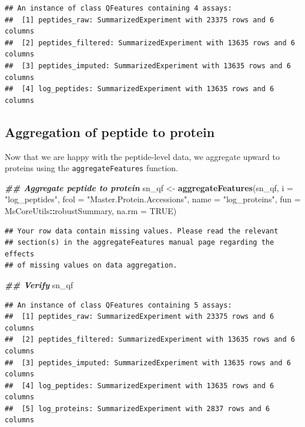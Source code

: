 \documentclass[9pt,a4paper,]{extarticle}
\newenvironment{Shaded}{\begin{snugshade}}{\end{snugshade}}
\newcommand{\AttributeTok}[1]{\textcolor[rgb]{0.13,0.29,0.53}{#1}}
\newcommand{\ConstantTok}[1]{\textcolor[rgb]{0.56,0.35,0.01}{#1}}
\newcommand{\DocumentationTok}[1]{\textcolor[rgb]{0.56,0.35,0.01}{\textbf{\textit{#1}}}}
\newcommand{\FunctionTok}[1]{\textcolor[rgb]{0.13,0.29,0.53}{\textbf{#1}}}
\newcommand{\NormalTok}[1]{#1}
\newcommand{\OtherTok}[1]{\textcolor[rgb]{0.56,0.35,0.01}{#1}}
\newcommand{\SpecialCharTok}[1]{\textcolor[rgb]{0.81,0.36,0.00}{\textbf{#1}}}
\newcommand{\StringTok}[1]{\textcolor[rgb]{0.31,0.60,0.02}{#1}}
\begin{document}
\begin{verbatim}
## An instance of class QFeatures containing 4 assays:
##  [1] peptides_raw: SummarizedExperiment with 23375 rows and 6 columns 
##  [2] peptides_filtered: SummarizedExperiment with 13635 rows and 6 columns 
##  [3] peptides_imputed: SummarizedExperiment with 13635 rows and 6 columns 
##  [4] log_peptides: SummarizedExperiment with 13635 rows and 6 columns
\end{verbatim}

\hypertarget{aggregation-of-peptide-to-protein}{%
\subsection{Aggregation of peptide to protein}\label{aggregation-of-peptide-to-protein}}

Now that we are happy with the peptide-level data, we aggregate upward to
proteins using the \texttt{aggregateFeatures} function.

\begin{Shaded}
\begin{Highlighting}[]
\DocumentationTok{\#\# Aggregate peptide to protein}
\NormalTok{sn\_qf }\OtherTok{\textless{}{-}} \FunctionTok{aggregateFeatures}\NormalTok{(sn\_qf,}
                           \AttributeTok{i =} \StringTok{"log\_peptides"}\NormalTok{,}
                           \AttributeTok{fcol =} \StringTok{"Master.Protein.Accessions"}\NormalTok{,}
                           \AttributeTok{name =} \StringTok{"log\_proteins"}\NormalTok{,}
                           \AttributeTok{fun =}\NormalTok{ MsCoreUtils}\SpecialCharTok{::}\NormalTok{robustSummary,}
                           \AttributeTok{na.rm =} \ConstantTok{TRUE}\NormalTok{)}
\end{Highlighting}
\end{Shaded}

\begin{verbatim}
## Your row data contain missing values. Please read the relevant
## section(s) in the aggregateFeatures manual page regarding the effects
## of missing values on data aggregation.
\end{verbatim}

\begin{Shaded}
\begin{Highlighting}[]
\DocumentationTok{\#\# Verify}
\NormalTok{sn\_qf}
\end{Highlighting}
\end{Shaded}

\begin{verbatim}
## An instance of class QFeatures containing 5 assays:
##  [1] peptides_raw: SummarizedExperiment with 23375 rows and 6 columns 
##  [2] peptides_filtered: SummarizedExperiment with 13635 rows and 6 columns 
##  [3] peptides_imputed: SummarizedExperiment with 13635 rows and 6 columns 
##  [4] log_peptides: SummarizedExperiment with 13635 rows and 6 columns 
##  [5] log_proteins: SummarizedExperiment with 2837 rows and 6 columns
\end{verbatim}
\end{document}

